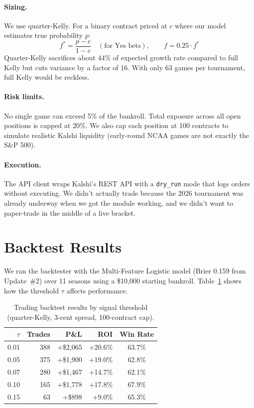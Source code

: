 \documentclass[11pt,a4paper]{article}
\begin{document}
\paragraph{Sizing.} We use quarter-Kelly. For a binary contract priced at $c$ where our model estimates true probability $p$:
\[
f^* = \frac{p - c}{1 - c} \quad (\text{for Yes bets}), \qquad f = 0.25 \cdot f^*
\]
Quarter-Kelly sacrifices about 44\% of expected growth rate compared to full Kelly but cuts variance by a factor of 16. With only 63 games per tournament, full Kelly would be reckless.

\paragraph{Risk limits.} No single game can exceed 5\% of the bankroll. Total exposure across all open positions is capped at 20\%. We also cap each position at 100 contracts to simulate realistic Kalshi liquidity (early-round NCAA games are not exactly the S\&P 500).

\paragraph{Execution.} The API client wraps Kalshi's REST API with a \texttt{dry\_run} mode that logs orders without executing. We didn't actually trade because the 2026 tournament was already underway when we got the module working, and we didn't want to paper-trade in the middle of a live bracket.


\section{Backtest Results}

We ran the backtester with the Multi-Feature Logistic model (Brier 0.159 from Update~\#2) over 11 seasons using a \$10{,}000 starting bankroll. Table~\ref{tab:threshold} shows how the threshold $\tau$ affects performance.

\begin{table}[h]
\centering
\caption{Trading backtest results by signal threshold (quarter-Kelly, 3-cent spread, 100-contract cap).}
\label{tab:threshold}
\small
\begin{tabular}{@{}rrrrc@{}}
\toprule
$\tau$ & Trades & P\&L & ROI & Win Rate \\
\midrule
0.01 & 388 & +\$2{,}065 & +20.6\% & 63.7\% \\
0.05 & 375 & +\$1{,}900 & +19.0\% & 62.8\% \\
0.07 & 280 & +\$1{,}467 & +14.7\% & 62.1\% \\
0.10 & 165 & +\$1{,}778 & +17.8\% & 67.9\% \\
0.15 & 63 & +\$898 & +9.0\% & 65.3\% \\
\bottomrule
\end{tabular}
\end{table}
\end{document}
